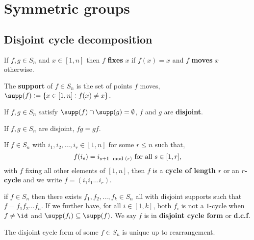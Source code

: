 \section{Symmetric groups}

\subsection{Disjoint cycle decomposition}

\begin{definition}
    If $f,g\in S_n$ and $x\in[1,n]$ then $f$ \textbf{fixes} $x$ if $f(x)=x$ and $f$ \textbf{moves} $x$ otherwise. 
\end{definition}

\begin{definition}
    The \textbf{support} of $f\in S_n$ is the set of points $f$ moves, $\supp(f):=\{x\in[1,n]:f(x)\neq x\}$.
\end{definition}

\begin{definition}
    If $f,g\in S_n$ satisfy $\supp(f)\cap\supp(g)=\emptyset$, $f$ and $g$ are \textbf{disjoint}.
\end{definition}

\begin{lemma}
    If $f,g\in S_n$ are disjoint, $fg=gf$.
\end{lemma}

\begin{definition}[Cycles]
    If $f\in S_n$ with $i_1,i_2,\ldots,i_r\in[1,n]$ for some $r\leq n$ such that, \[
        f(i_s) = i_{s+1 \mod(r)} \ \text{\textcolor{black}{for all }} s\in[1,r]
    \textcolor{black}{,}
    \] with $f$ fixing all other elements of $[1,n]$, then $f$ is a \textbf{cycle of length $r$} or an \textbf{$r$-cycle} and we write $f=(i_1i_1\ldots i_r)$.
\end{definition}

\begin{theorem}
    if $f\in S_n$ then there exists $f_1,f_2,\ldots,f_k\in S_n$ all with disjoint supports such that $f=f_1f_2\ldots f_n$. If we further have, for all $i\in[1,k]$, both $f_i$ is not a $1$-cycle when $f\neq \id$ and $\supp(f_i)\subseteq\supp(f)$. We say $f$ is in \textbf{disjoint cycle form} or \textbf{d.c.f}.
\end{theorem}

\begin{theorem}
    The disjoint cycle form of some $f\in S_n$ is unique up to rearrangement.
\end{theorem}

